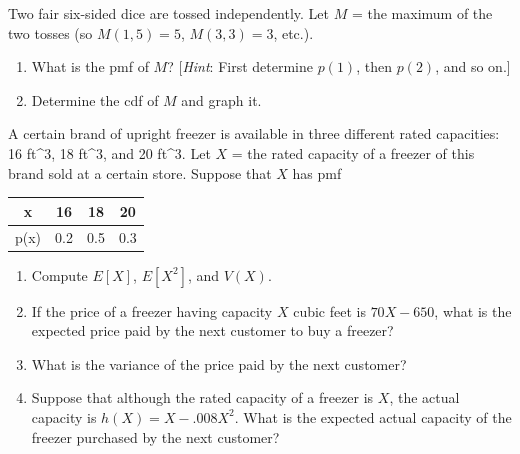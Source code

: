 \documentclass[11pt,letterpaper,boxed]{hmcpset}
\newcommand{\bk}[1]{\left[ #1 \right]}
\begin{document}
{\begin{solution}
	\vfill
\end{solution}
\newpage


\begin{problem}[3.2.18]
	Two fair six-sided dice are tossed independently. Let $M$ = the maximum of the two tosses (so $M(1,5) = 5$, $M(3,3) = 3$, etc.).
	\begin{enumerate}
		\item
			What is the pmf of $M$? [\textit{Hint}: First determine $p(1)$, then
$p(2)$, and so on.]
		\item
			Determine the cdf of $M$ and graph it.
	\end{enumerate}
\end{problem}

\begin{solution}
	\vfill
\end{solution}
\newpage


\begin{problem}[3.3.32]
	A certain brand of upright freezer is available in three different rated capacities: 16 ft^3, 18 ft^3, and 20 ft^3. Let $X$ = the rated capacity of a freezer of this brand sold at a certain store. Suppose that $X$ has pmf
	\begin{center}
		\begin{tabular}{c|c c c}
			x & 16 & 18 & 20\\
 			\hline
 			p(x) & 0.2 & 0.5 & 0.3 \\
	 	\end{tabular}
	\end{center}
	\begin{enumerate}
		\item
            Compute $E\bk{X}$, $E\bk{X^2}$, and $V(X)$.
		\item
			If the price of a freezer having capacity $X$ cubic feet is $70X - 650$, what is the expected price paid by the next customer to buy a freezer?
		\item
			What is the variance of the price paid by the next customer?
		\item
			Suppose that although the rated capacity of a freezer is $X$, the actual capacity is $h(X) = X - .008X^2$. What is the expected actual capacity of the freezer purchased by the next customer?
	\end{enumerate}
\end{problem}

}
\end{document}
